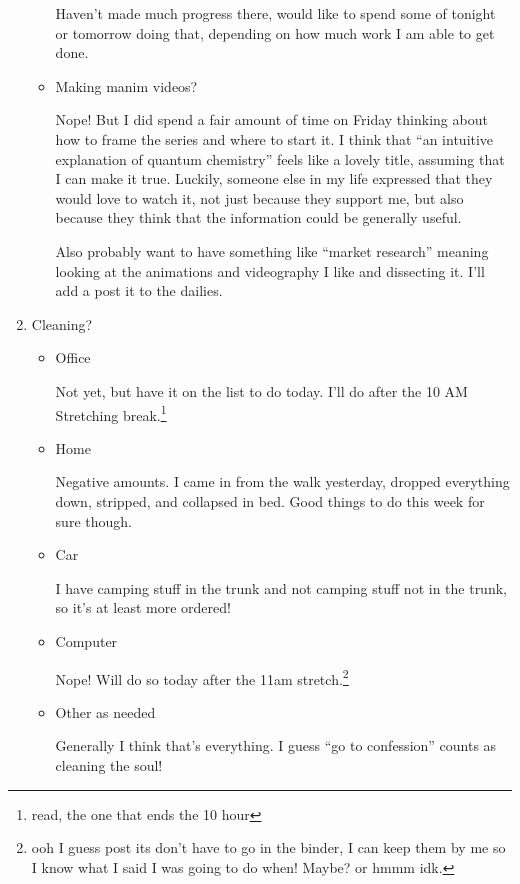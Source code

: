 \documentclass[12pt]{article}
\newcommand{\say}[1]{``#1''}
\renewcommand{\,}{\textsuperscript{,}}
\begin{document}
\begin{enumerate}
\begin{itemize}
Haven't made much progress there, would like to spend some of tonight or tomorrow doing that, depending on how much work I am able to get done.

\item Making manim videos?

Nope! But I did spend a fair amount of time on Friday thinking about how to frame the series and where to start it.  
I think that \say{an intuitive explanation of quantum chemistry} feels like a lovely title, assuming that I can make it true.  
Luckily, someone else in my life expressed that they would love to watch it, not just because they support me, but also because they think that the information could be generally useful.

Also probably want to have something like \say{market research} meaning looking at the animations and videography I like and dissecting it.  
I'll add a post it to the dailies.

\end{itemize}

\item Cleaning?

\begin{itemize}

\item Office

Not yet, but have it on the list to do today. I'll do after the 10 AM Stretching break.\footnote{read, the one that ends the 10 hour}

\item Home

Negative amounts. I came in from the walk yesterday, dropped everything down, stripped, and collapsed in bed.  
Good things to do this week for sure though.

\item Car

I have camping stuff in the trunk and not camping stuff not in the trunk, so it's at least more ordered!

\item Computer

Nope! Will do so today after the 11am stretch.\footnote{ooh I guess post its don't have to go in the binder, I can keep them by me so I know what I said I was going to do when! Maybe? or hmmm idk.}

\item Other as needed

Generally I think that's everything.  
I guess \say{go to confession} counts as cleaning the soul!


\end{itemize}
\end{enumerate}
\end{document}
